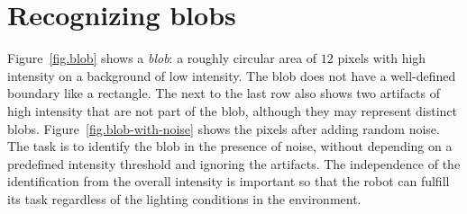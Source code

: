 \section{Recognizing blobs}\label{s.blob}

Figure~\ref{fig.blob} shows a \emph{blob}: a roughly circular area of $12$ pixels with high intensity on a background of low intensity. The blob does not have a well-defined boundary like a rectangle. The next to the last row also shows two artifacts of high intensity that are not part of the blob, although they may represent distinct blobs. Figure~\ref{fig.blob-with-noise} shows the pixels after adding random noise. The task is to identify the blob in the presence of noise, without depending on a predefined intensity threshold and ignoring the artifacts. The independence of the identification from the overall intensity is important so that the robot can fulfill its task regardless of the lighting conditions in the environment.

